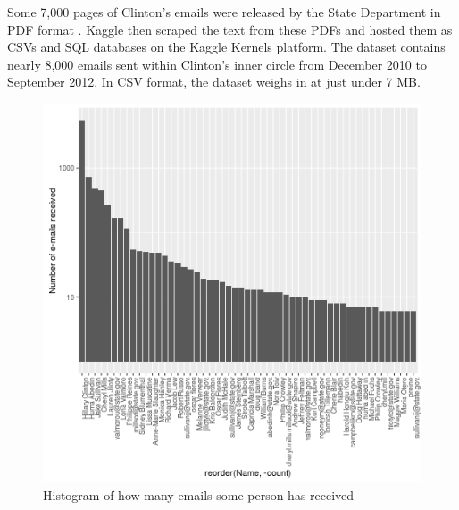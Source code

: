 Some 7,000 pages of Clinton's emails were released by the State Department in PDF format \cite{kaggle:emails}.
Kaggle then scraped the text from these PDFs and hosted them as CSVs and SQL databases on the Kaggle Kernels platform.
The dataset contains nearly 8,000 emails sent within Clinton's inner circle from December 2010 to September 2012.
In CSV format, the dataset weighs in at just under 7 MB.

\begin{figure}[h]
  \centering
  \includegraphics[scale=0.8]{palmer/graphics/num_recvd_histogram}
  \caption{Histogram of how many emails some person has received}
  \label{fig:n_recv_hist}
\end{figure}

